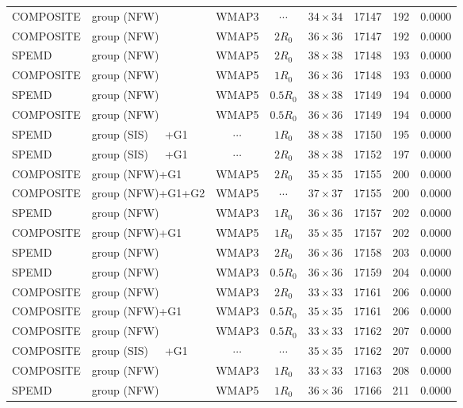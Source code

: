 \documentclass[useAMS,usenatbib]{mnras}
\def\nomicro{$\cdots$}
\def\nodata{$\cdots$}
\begin{document}
\begin{table}
\begin{tabular}{llccccrr}
        COMPOSITE & group (NFW)       &WMAP3 & \nomicro&$34\times34$ & 17147 & 192 & 0.0000\\
        COMPOSITE & group (NFW)       &WMAP5 & $2R_{0}$&$36\times36$ & 17147 & 192 & 0.0000\\
        SPEMD     & group (NFW)       &WMAP5 & $2R_{0}$&$38\times38$ & 17148 & 193 & 0.0000\\
        COMPOSITE & group (NFW)       &WMAP5 & $1R_{0}$&$36\times36$ & 17148 & 193 & 0.0000\\
        SPEMD     & group (NFW)       &WMAP5 & $0.5R_{0}$&$38\times38$ & 17149 & 194 & 0.0000\\
        COMPOSITE & group (NFW)       &WMAP5 & $0.5R_{0}$&$36\times36$ & 17149 & 194 & 0.0000\\
        SPEMD     & group (SIS)~~~+G1 &\nodata& $1R_{0}$&$38\times38$ & 17150 & 195 & 0.0000\\
        SPEMD     & group (SIS)~~~+G1 &\nodata& $2R_{0}$&$38\times38$ & 17152 & 197 & 0.0000\\
        COMPOSITE & group (NFW)+G1    &WMAP5 & $2R_{0}$&$35\times35$ & 17155 & 200 & 0.0000\\
        COMPOSITE & group (NFW)+G1+G2 &WMAP5 & \nomicro&$37\times37$ & 17155 & 200 & 0.0000\\
        SPEMD     & group (NFW)       &WMAP3 & $1R_{0}$&$36\times36$ & 17157 & 202 & 0.0000\\
        COMPOSITE & group (NFW)+G1    &WMAP5 & $1R_{0}$&$35\times35$   & 17157 & 202 & 0.0000\\
        SPEMD     & group (NFW)       &WMAP3 & $2R_{0}$&$36\times36$ & 17158 & 203 & 0.0000\\
        SPEMD     & group (NFW)       &WMAP3 & $0.5R_{0}$&$36\times36$ & 17159 & 204 & 0.0000\\
        COMPOSITE & group (NFW)       &WMAP3 & $2R_{0}$&$33\times33$ & 17161 & 206 & 0.0000\\
        COMPOSITE & group (NFW)+G1    &WMAP3 & $0.5R_{0}$&$35\times35$ & 17161 & 206 & 0.0000\\
        COMPOSITE & group (NFW)       &WMAP3 & $0.5R_{0}$&$33\times33$ & 17162 & 207 & 0.0000\\
        COMPOSITE & group (SIS)~~~+G1 &\nodata& \nomicro&$35\times35$ & 17162 & 207 & 0.0000\\
        COMPOSITE & group (NFW)       &WMAP3 & $1R_{0}$&$33\times33$ & 17163 & 208 & 0.0000\\
        SPEMD     & group (NFW)       &WMAP5 & $1R_{0}$&$36\times36$ & 17166 & 211 & 0.0000\\

\end{tabular}
\end{table}
\end{document}
